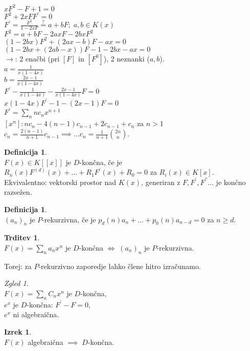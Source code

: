 \documentclass[a4paper, 12pt]{book}
\theoremstyle{definition}
\newtheorem{defn}[counter]{Definicija}
\newtheorem{claim}[counter]{Trditev}
\newtheorem{theorem}[counter]{Izrek}
\theoremstyle{remark}
\newtheorem*{exmp}{Zgled}
\begin{document}
$x F^2 - F + 1 = 0$ \\
$F^2 + 2 x F F^{'} = 0$ \\
$F^{'} = \frac{F^2}{1 - 2 x F} \stackrel{?}{=} a + bF; \; a, b \in K(x)$ \\
$F^2 = a + b F - 2 a x F - 2 b x F^2$ \\
$(1 - 2 b x) F^2 + (2 a x - b) F - a x = 0$ \\
$(1 - 2 b x + (2 a b - x)) F - 1 - 2 b x - a x = 0$ \\
$\to$: 2 enačbi (pri $[F]$ in $[F^0]$), 2 neznanki ($a, b$). \\
$a = \frac{1}{x (1-4x)}$ \\
$b = \frac{2x-1}{x (1-4x)}$ \\
$F^{'} - \frac{1}{x (1-4x)} - \frac{2x-1}{x (1-4x)} F = 0$ \\
$x (1-4x) F^{'} - 1 - (2x-1) F = 0$ \\
$F^{'} = \sum_n n c_n x^{n+1}$ \\
$[x^n]: n c_n - 4 (n-1) c_{n-1} + 2 c_{n-1} + c_n$ za $n > 1$ \\
$c_n = \frac{2 (n-1)}{n+1} c_{n-1} \implies \dots c_n = \frac{1}{n+1} \binom{2n}{n}$.
\begin{defn} \text{} \\
  $F(x) \in K[[x]]$ je $D$-končna, če je \\
  $R_n(x) F^{(d)}(x) + \dots + R_1 F^{'}(x) + R_0 = 0$ za $R_i(x) \in K[x]$. \\
  Ekvivalentno: vektorski prostor nad $K(x)$, generiran z $F, F^{'}, F^{''} \dots$ je končno razsežen.
\end{defn}
\begin{defn} \text{} \\
  $(a_n)_n$ je $P$-rekurzivna, če je $p_d(n) a_n + \dots + p_0(n) a_{n-d} = 0$ za $n \geq d$.
\end{defn}
\begin{claim} \text{} \\
  $F(x) = \sum_n a_n x^n$ je $D$-končna $\iff \; (a_n)_n$ je $P$-rekurzivna.
\end{claim}
Torej: za $P$-rekurzivno zaporedje lahko člene hitro izračunamo.
\begin{exmp} \text{} \\
  $F(x) = \sum_n C_n x^n$ je $D$-končna, \\
  $e^x$ je $D$-končna: $F^{'} - F = 0$, \\
  $e^x$ ni algebraična.
\end{exmp}
\begin{theorem} \text{} \\
  $F(x)$ algebraična $\implies \; D$-končna.
\end{theorem}
\end{document}

